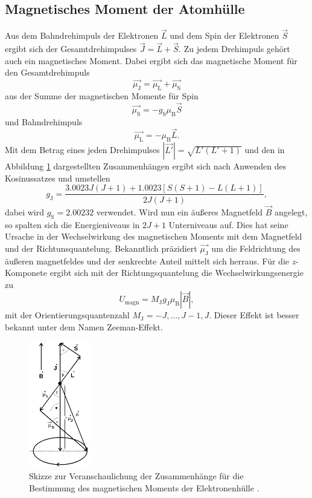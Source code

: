 \subsection{Magnetisches Moment der Atomhülle}
\label{sec:atomhülle}
Aus dem Bahndrehimpuls der Elektronen $\vec{L}$ und dem Spin der Elektronen $\vec{S}$ ergibt sich der
Gesamtdrehimpulses $\vec{J} = \vec{L} + \vec{S}$. Zu jedem Drehimpuls gehört auch ein magnetisches Moment.
Dabei ergibt sich das magnetische Moment für den Gesamtdrehimpuls 
\begin{equation*}
  \vec{\mu_\text{J}} = \vec{\mu_\text{L}} + \vec{\mu_\text{S}}
\end{equation*}
aus der Summe der magnetischen Momente für Spin 
\begin{equation}
\label{eqn:magspin}
  \vec{\mu_\text{S}} = -g_\text{S} \mu_\text{B} \vec{S}
\end{equation}
und Bahndrehimpuls
\begin{equation}
  \label{ean:magbahn}
  \vec{\mu_\text{L}} = - \mu_\text{B} \vec{L}.
\end{equation}
Mit dem Betrag eines jeden Drehimpulses $|\vec{L'}| = \sqrt{L' \left(L'+1\right)}$ und den
in Abbildung \ref{fig:magnmoment} dargestellten Zusammenhängen ergibt sich nach Anwenden des Kosinussatzes
und umstellen
\begin{equation}
  \label{eqn:gj}
  g_\text{J} = \frac{\num{3.0023}J(J+1)+\num{1.0023}[S(S+1)-L(L+1)]}{2J(J+1)},
\end{equation}
dabei wird $g_\text{S} = \num{2.00232}$ verwendet.
Wird nun ein äußeres Magnetfeld $\vec{B}$ angelegt, so spalten sich die Energieniveaus in $2J+1$ Unterniveaus auf.
Dies hat seine Ursache in der Wechselwirkung des magnetischen Moments mit dem Magnetfeld und der Richtunsquantelung.
Bekanntlich präzidiert $\vec{\mu_\text{J}}$ um die Feldrichtung des äußeren magnetfeldes und der senkrechte Anteil mittelt 
sich herraus. Für die $z$-Komponete ergibt sich mit der Richtungsquantelung die Wechselwirkungsenergie zu
\begin{equation}
  \label{eqn:wwenergie}
  U_\text{magn} = M_\text{J} g_\text{J} \mu_\text{B} |\vec{B}|,
\end{equation}
mit der Orientierungsquantenzahl $M_\text{J} = -J, \ldots, J-1 ,J$. Dieser Effekt ist besser bekannt unter
dem Namen Zeeman-Effekt.
\begin{figure}
  \centering
  \includegraphics[height=5.5cm]{content/pictures/MagnMoment.png}
  \caption{Skizze zur Veranschaulichung der Zusammenhänge für die Bestimmung des magnetischen Moments der Elektronenhülle \cite{anleitung}.}
  \label{fig:magnmoment}
\end{figure}

